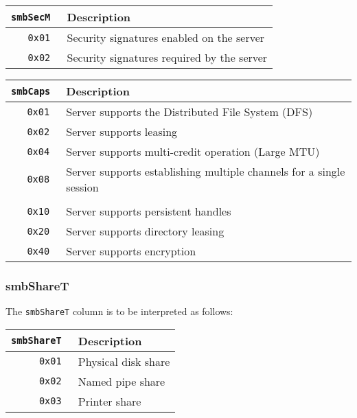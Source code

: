 \documentclass[documentation]{subfiles}
\begin{document}
\begin{longtable}{>{\tt}rl}
    \toprule
    {\bf smbSecM} & {\bf Description}\\
    \midrule\endhead%
    0x01 & Security signatures enabled on the server\\
    0x02 & Security signatures required by the server\\
    \bottomrule
\end{longtable}

\begin{longtable}{>{\tt}rl}
    \toprule
    {\bf smbCaps} & {\bf Description}\\
    \midrule\endhead%
    0x01 & Server supports the Distributed File System (DFS)\\
    0x02 & Server supports leasing\\
    0x04 & Server supports multi-credit operation (Large MTU)\\
    0x08 & Server supports establishing multiple channels for a single session\\
    \\
    0x10 & Server supports persistent handles\\
    0x20 & Server supports directory leasing\\
    0x40 & Server supports encryption\\
    \bottomrule
\end{longtable}

\subsubsection{smbShareT}\label{smbShareT}
The {\tt smbShareT} column is to be interpreted as follows:

\begin{longtable}{>{\tt}rl}
    \toprule
    {\bf smbShareT} & {\bf Description}\\
    \midrule\endhead%
    0x01 & Physical disk share\\
    0x02 & Named pipe share\\
    0x03 & Printer share\\
    \bottomrule
\end{longtable}
\end{document}
